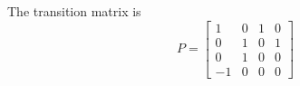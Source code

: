 The transition matrix is
$$P = \begin{bmatrix}
    1&0&1&0\\
    0&1&0&1\\
    0&1&0&0\\
    -1&0&0&0
\end{bmatrix}$$ 
